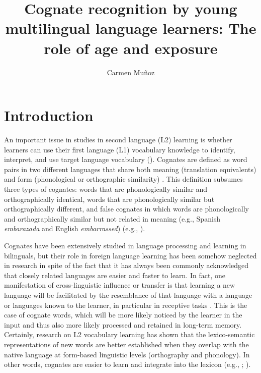 \documentclass[output=paper,modfonts,nonflat,newtxmath]{langsci/langscibook}
\author{Carmen Muñoz\affiliation{Universitat de Barcelona}}
\title{{Cognate} {recognition} {by} {young} {multilingual} {language} {learners}: {The} {role} {of} {age} {and} {exposure}}
\begin{document}
\maketitle
{}

\section{Introduction}


 {An important issue in studies in second language (L2) learning is whether learners can use their first language (L1) vocabulary knowledge to identify, interpret, and use target language vocabulary (\citealt{MendezPerezEtAl2010}). Cognates are defined as word pairs in two different languages that share both meaning (translation equivalents) and form (phonological or orthographic similarity) \citep{KohnertEtAl2004}. This definition subsumes three types of cognates: words that are phonologically similar and orthographically identical, words that are phonologically similar but orthographically different, and false cognates in which words are phonologically and orthographically similar but not related in meaning (e.g., Spanish} {\textit{embarazada}} {and English} {\textit{embarrassed}}{) (e.g., \citealt{Rodriguez2001}).}

 {Cognates have been extensively studied in language processing and learning in bilinguals, but their role in foreign language learning has been somehow neglected in research in spite of the fact that it has always been commonly acknowledged that closely related languages are easier and faster to learn. In fact, one manifestation of cross-linguistic influence or transfer is that learning a new language will be facilitated by the resemblance of that language with a language or languages known to the learner, in particular in receptive tasks \citep{Ringbom2007}. This is the case of cognate words, which will be more likely noticed by the learner in the input and thus also more likely processed and retained in long-term memory. Certainly, research on L2 vocabulary learning has shown that the lexico-semantic representations of new words are better established when they overlap with the native language at form-based linguistic levels (orthography and phonology). In other words, cognates are easier to learn and integrate into the lexicon (e.g., \citealt{EllisNBeaton1993}; \citealt{DeGrootvanHell2005}).}
\end{document}
